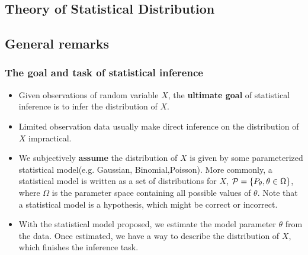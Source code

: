 
\begin{refsection}
\startcontents[chapters]	
\chapter{Theory of Statistical Distribution}\label{ch:theory-of-statistics}

\section{General remarks}

\subsection{The goal and task of statistical inference}
\begin{itemize}
	\item Given observations of random variable $X$, the \textbf{ultimate goal} of statistical inference is to infer the distribution of $X$.
	\item Limited observation data usually make direct inference on the distribution of $X$ impractical.
	\item We subjectively \textbf{assume} the distribution of $X$ is given by some parameterized statistical model(e.g. Gaussian, Binomial,Poisson). More commonly, a statistical model is written as a set of distributions for $X$, $\mathcal{P}=\{P_\theta,\theta\in\Omega\}$, where $\Omega$ is the parameter space containing all possible values of $\theta$. Note that a statistical model is a hypothesis, which might be correct or incorrect.
	\item With the statistical model proposed, we estimate the model parameter $\theta$ from the data. Once estimated, we have a way to describe the distribution of $X$, which finishes the inference task.
\end{itemize}


\end{refsection}
